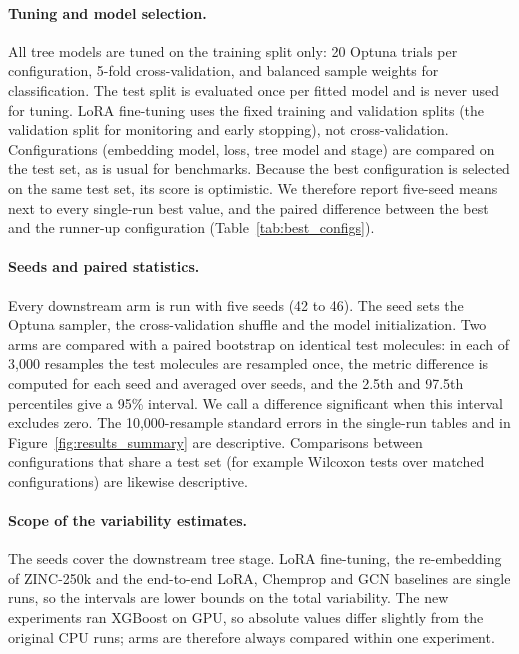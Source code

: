 \documentclass[pdflatex,sn-mathphys-num,Numbered]{sn-jnl}%
\begin{document}
\paragraph{Tuning and model selection.} All tree models are tuned on the training split only: 20 Optuna trials per configuration, 5-fold cross-validation, and balanced sample weights for classification. The test split is evaluated once per fitted model and is never used for tuning. LoRA fine-tuning uses the fixed training and validation splits (the validation split for monitoring and early stopping), not cross-validation. Configurations (embedding model, loss, tree model and stage) are compared on the test set, as is usual for benchmarks. Because the best configuration is selected on the same test set, its score is optimistic. We therefore report five-seed means next to every single-run best value, and the paired difference between the best and the runner-up configuration (Table~\ref{tab:best_configs}).

\paragraph{Seeds and paired statistics.} Every downstream arm is run with five seeds (42 to 46). The seed sets the Optuna sampler, the cross-validation shuffle and the model initialization. Two arms are compared with a paired bootstrap on identical test molecules: in each of 3{,}000 resamples the test molecules are resampled once, the metric difference is computed for each seed and averaged over seeds, and the 2.5th and 97.5th percentiles give a 95\% interval. We call a difference significant when this interval excludes zero. The 10{,}000-resample standard errors in the single-run tables and in Figure~\ref{fig:results_summary} are descriptive. Comparisons between configurations that share a test set (for example Wilcoxon tests over matched configurations) are likewise descriptive.

\paragraph{Scope of the variability estimates.} The seeds cover the downstream tree stage. LoRA fine-tuning, the re-embedding of ZINC-250k and the end-to-end LoRA, Chemprop and GCN baselines are single runs, so the intervals are lower bounds on the total variability. The new experiments ran XGBoost on GPU, so absolute values differ slightly from the original CPU runs; arms are therefore always compared within one experiment.
\end{document}
